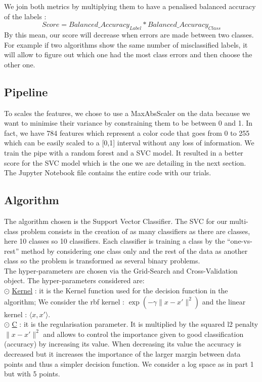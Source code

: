 We join both metrics by multiplying them to have a penalised balanced accuracy of the labels : 
\begin{equation*}
	Score  = Balanced\_Accuracy_{Label} *  Balanced\_Accuracy_{Class}
\end{equation*}
By this mean, our score will decrease when errors are made between two classes. For example if two algorithms show the same number of misclassified labels, it will allow to figure out which one had the most class errors and then choose the other one.  


\subsection{Pipeline}
To scales the features, we chose to use a MaxAbsScaler on the data because we want to minimise their variance by constraining them to be between 0 and 1. In fact, we have 784 features which represent a color code that goes from 0 to 255 which can be easily scaled to a [0,1] interval without any loss of information. We train the pipe with a random forest and a SVC model. It resulted in a better score for the SVC model which is the one we are detailing in the next section. The Jupyter Notebook file contains the entire code with our trials. 

\subsection{Algorithm}
The algorithm chosen is the Support Vector Classifier. The SVC for our multi-class problem consists in the creation of as many classifiers as there are classes, here 10 classes so 10 classifiers. Each classifier is training a class by the “one-vs-rest” method by considering one class only and the rest of the data as another class so the problem is transformed as several binary problems. \\

The hyper-parameters are chosen via the Grid-Search and Cross-Validation object. The hyper-parameters considered are: \\
$\odot$ \underline{Kernel} : it is the Kernel function used for the decision function in the algorithm; We consider the rbf kernel :  $\exp(-\gamma \|x-x'\|^2)$ and the linear kernel : $\langle x, x'\rangle$. \\
$\odot$ \underline{C} : it is the regularisation parameter. It is multiplied by the squared l2 penalty $\|x-x'\|^2$ and allows to control the importance given to good classification (accuracy) by increasing its value. When decreasing its value the accuracy is decreased but it increases the importance of the larger margin between data points and thus a simpler decision function. We consider a log space as in part 1 but with 5 points.  
\\

